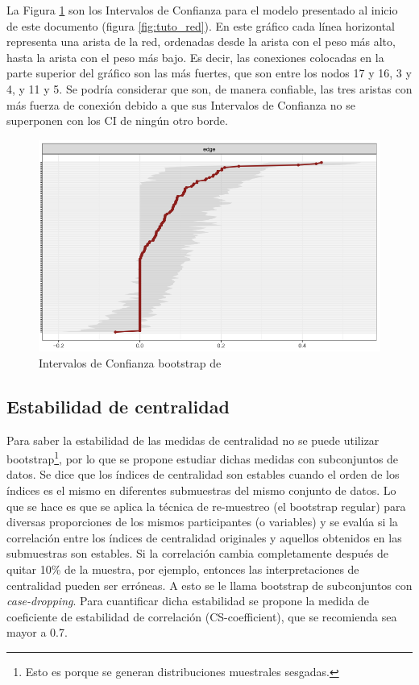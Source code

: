 \documentclass[11pt,spanish]{article}\usepackage[]{graphicx}\usepackage[]{color}
\begin{document}
La Figura \ref{fig:inter_boot_tutorial} son los Intervalos de Confianza para el modelo presentado al inicio de este documento (figura \ref{fig:tuto_red}). En este gráfico cada línea horizontal representa una arista de la red, ordenadas desde la arista con el peso más alto, hasta la arista con el peso más bajo. Es decir, las conexiones colocadas en la parte superior del gráfico son las más fuertes, que son entre los nodos 17 y 16, 3 y 4, y 11 y 5. Se podría considerar que son, de manera confiable, las tres aristas con más fuerza de conexión debido a que sus Intervalos de Confianza no se superponen con los CI de ningún otro borde.

\begin{figure}[!ht]
\centering
\includegraphics[scale=0.5]{images/intervalos_boot_tutorial}
\caption{Intervalos de Confianza bootstrap de \cite{main_tutorial}}
\label{fig:inter_boot_tutorial}
\end{figure}

\subsection{Estabilidad de centralidad}

Para saber la estabilidad de las medidas de centralidad no se puede utilizar bootstrap\footnote{Esto es porque se generan distribuciones muestrales sesgadas.}, por lo que se propone estudiar dichas medidas con subconjuntos de datos. Se dice que los índices de centralidad son estables cuando el orden de los índices es el mismo en diferentes submuestras del mismo conjunto de datos. Lo que se hace es que se aplica la técnica de re-muestreo (el bootstrap regular) para diversas proporciones de los mismos participantes (o variables) y se evalúa si la correlación entre los índices de centralidad originales y aquellos obtenidos en las submuestras son estables. Si la correlación cambia completamente después de quitar 10\% de la muestra, por ejemplo, entonces las interpretaciones de centralidad pueden ser erróneas. A esto se le llama bootstrap de subconjuntos con \emph{case-dropping}. Para cuantificar dicha estabilidad se propone la medida de coeficiente de estabilidad de correlación (CS-coefficient), que se recomienda sea mayor a 0.7.
\end{document}
